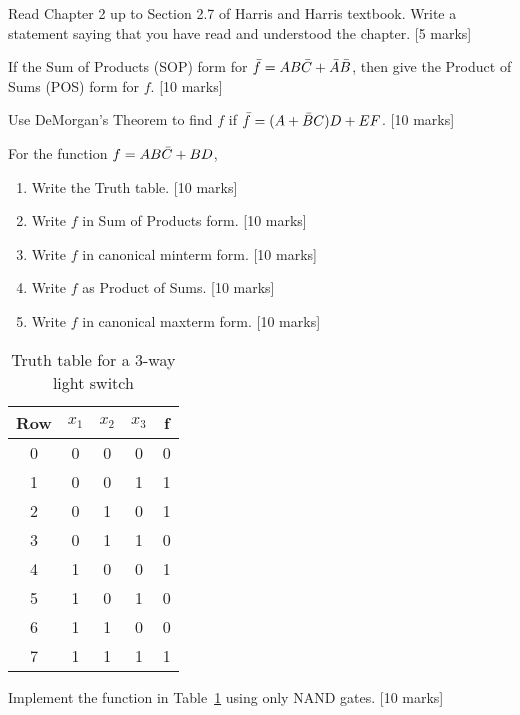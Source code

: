
\begin{prob}
  Read Chapter 2 up to Section 2.7 of Harris and Harris textbook. Write a statement saying that you have read and understood the chapter. [5 marks]
\end{prob}

\begin{prob}
If the Sum of Products (SOP) form for $ \bar{f} = AB\bar{C}+\bar{A}\bar{B}$, then give the Product of Sums (POS) form for
$f$. [10 marks]
\end{prob}

\begin{prob}
Use DeMorgan's Theorem to find $f$  if  $\bar{f} = (A + \bar{B} C)D + EF$. [10 marks]
\end{prob}


\begin{prob}
  For the function $f = AB\bar{C} + BD$,
  \begin{enumerate}
    \item Write the Truth table. [10 marks]
    \item Write $f$ in Sum of Products form. [10 marks]
    \item Write $f$ in canonical minterm form. [10 marks]
    \item Write $f$ as Product of Sums. [10 marks]
    \item Write $f$ in canonical maxterm form. [10 marks]
  \end{enumerate}
\end{prob}

\begin{table}
  \centering
  \begin{tabular}{c|ccc||c}
    \toprule
    Row & $x_1$ & $x_2$ & $x_3$ & f \\
    \midrule
    0 & 0 & 0 & 0 & 0 \\
    1 & 0 & 0 & 1 & 1 \\
    2 & 0 & 1 & 0 & 1 \\
    3 & 0 & 1 & 1 & 0 \\
    4 & 1 & 0 & 0 & 1 \\
    5 & 1 & 0 & 1 & 0 \\
    6 & 1 & 1 & 0 & 0 \\
    7 & 1 & 1 & 1 & 1 \\
    \bottomrule
    \end{tabular}
    \caption{Truth table for a 3-way light switch}
    \label{tab:3-way-light-switch}
\end{table}

\begin{prob}
 Implement the function in Table~\ref{tab:3-way-light-switch} using only NAND
 gates. [10 marks]
\end{prob}

